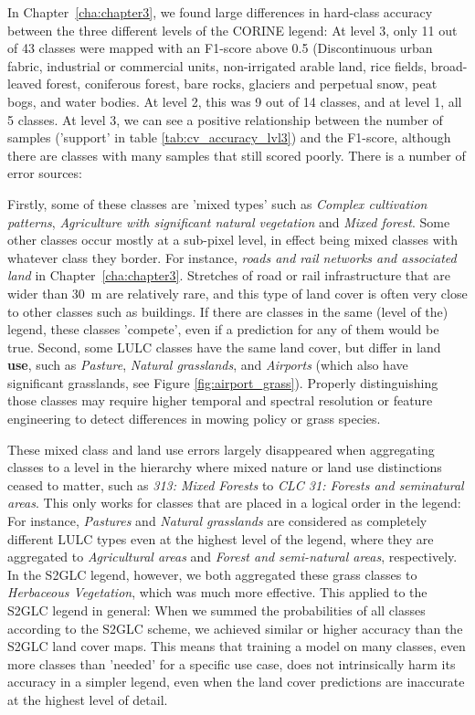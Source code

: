         In Chapter\@~\ref{cha:chapter3}, we found large differences in hard-class accuracy between the three different levels of the CORINE legend: At level 3, only 11 out of 43 classes were mapped with an F1-score above 0.5 (Discontinuous urban fabric, industrial or commercial units, non-irrigated arable land, rice fields, broad-leaved forest, coniferous forest, bare rocks, glaciers and perpetual snow, peat bogs, and water bodies. At level 2, this was 9 out of 14 classes, and at level 1, all 5 classes. At level 3, we can see a positive relationship between the number of samples ('support' in table \ref{tab:cv_accuracy_lvl3}) and the F1-score, although there are classes with many samples that still scored poorly. There is a number of error sources: 

        Firstly, some of these classes are 'mixed types' such as \textit{Complex cultivation patterns}, \textit{Agriculture with significant natural vegetation} and \textit{Mixed forest}. Some other classes occur mostly at a sub-pixel level, in effect being mixed classes with whatever class they border. For instance, \textit{roads and rail networks and associated land} in Chapter\@~\ref{cha:chapter3}. Stretches of road or rail infrastructure that are wider than 30~m are relatively rare, and this type of land cover is often very close to other classes such as buildings. If there are classes in the same (level of the) legend, these classes 'compete', even if a prediction for any of them would be true. 
        Second, some LULC classes have the same land cover, but differ in land \textbf{use}, such as \textit{Pasture}, \textit{Natural grasslands}, and \textit{Airports} (which also have significant grasslands, see Figure \ref{fig:airport_grass}). Properly distinguishing those classes may require higher temporal and spectral resolution or feature engineering to detect differences in mowing policy or grass species. 
        
        These mixed class and land use errors largely disappeared when aggregating classes to a level in the hierarchy where mixed nature or land use distinctions ceased to matter, such as \textit{313: Mixed Forests} to \textit{CLC 31: Forests and seminatural areas}. This only works for classes that are placed in a logical order in the legend: For instance, \textit{Pastures} and \textit{Natural grasslands} are considered as completely different LULC types even at the highest level of the legend, where they are aggregated to \textit{Agricultural areas} and \textit{Forest and semi-natural areas}, respectively. In the S2GLC legend, however, we both aggregated these grass classes to \textit{Herbaceous Vegetation}, which was much more effective. This applied to the S2GLC legend in general: When we summed the probabilities of all classes according to the S2GLC scheme, we achieved similar or higher accuracy than the S2GLC land cover maps. This means that training a model on many classes, even more classes than 'needed' for a specific use case, does not intrinsically harm its accuracy in a simpler legend, even when the land cover predictions are inaccurate at the highest level of detail.
    
